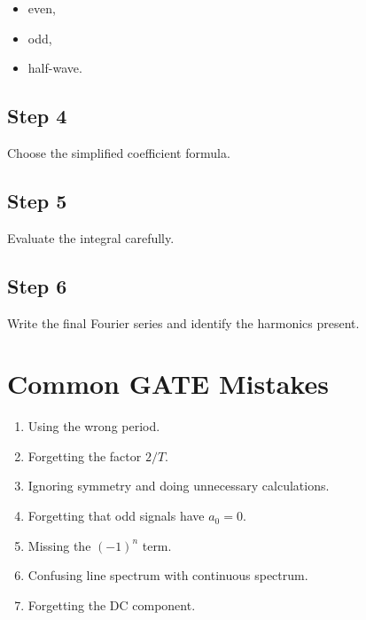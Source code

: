 \begin{itemize}
\item even,
\item odd,
\item half-wave.
\end{itemize}


\subsection{Step 4}

Choose the simplified coefficient formula.


\subsection{Step 5}

Evaluate the integral carefully.


\subsection{Step 6}

Write the final Fourier series and identify the harmonics present.


\section{Common GATE Mistakes}

\begin{enumerate}
\item Using the wrong period.
\item Forgetting the factor \(2/T\).
\item Ignoring symmetry and doing unnecessary calculations.
\item Forgetting that odd signals have \(a_0=0\).
\item Missing the \((-1)^n\) term.
\item Confusing line spectrum with continuous spectrum.
\item Forgetting the DC component.
\end{enumerate}

